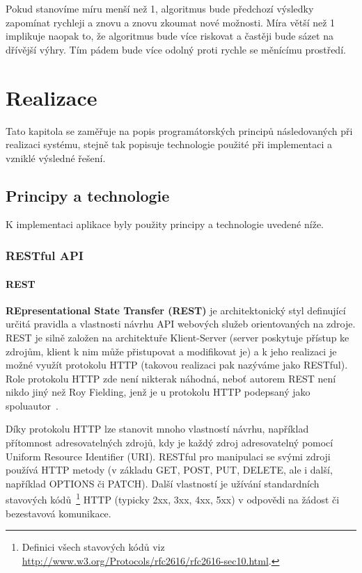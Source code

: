 \documentclass[thesis=M,czech]{FITthesis}[2014/05/07]
\begin{document}
Pokud stanovíme míru menší než 1, algoritmus bude předchozí výsledky zapomínat rychleji a znovu a znovu zkoumat nové možnosti. Míra větší než 1 implikuje naopak to, že algoritmus bude více riskovat a častěji bude sázet na dřívější výhry. Tím pádem bude více odolný proti rychle se měnícímu prostředí.
	
\chapter{Realizace}
\label{chap:impl}

Tato kapitola se zaměřuje na popis programátorských principů následovaných při realizaci systému, stejně tak popisuje technologie použité při implementaci a vzniklé výsledné řešení.

\section{Principy a technologie}
\label{sec:sysanalys}

K implementaci aplikace byly použity principy a technologie uvedené níže.

\subsection{RESTful API}
\label{rest}
\subsubsection{REST}
\textbf{REpresentational State Transfer (REST)} je architektonický styl definující určitá pravidla a vlastnosti návrhu API webových služeb orientovaných na zdroje. REST je silně založen na architektuře Klient-Server (server poskytuje přístup ke zdrojům, klient k nim může přistupovat a modifikovat je) a k jeho realizaci je možné využít protokolu HTTP (takovou realizaci pak nazýváme jako RESTful). Role protokolu HTTP zde není nikterak náhodná, neboť autorem REST není nikdo jiný než Roy Fielding, jenž je u protokolu HTTP podepsaný jako spoluautor~\cite{Fielding:2000:ASD:932295}. 

Díky protokolu HTTP lze stanovit mnoho vlastností návrhu, například přítomnost adresovatelných zdrojů, kdy je každý zdroj adresovatelný pomocí Uniform Resource Identifier (URI). RESTful pro manipulaci se svými zdroji používá HTTP metody (v základu GET, POST, PUT, DELETE, ale i další, například OPTIONS či PATCH). Další vlastností je užívání standardních stavových kódů~\footnote{Definici všech stavových kódů viz \url{http://www.w3.org/Protocols/rfc2616/rfc2616-sec10.html}.} HTTP (typicky 2xx, 3xx, 4xx, 5xx) v odpovědi na žádost či bezestavová komunikace.
\end{document}
